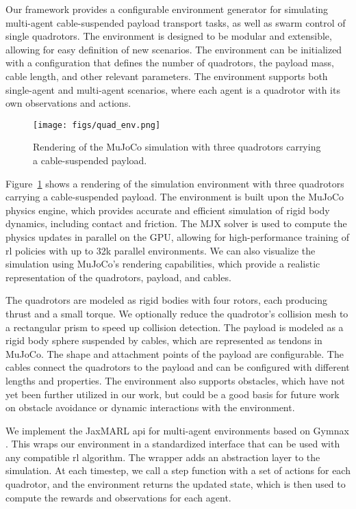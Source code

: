 Our framework provides a configurable environment generator for simulating multi-agent cable-suspended payload transport tasks, as well as swarm control of single quadrotors. The environment is designed to be modular and extensible, allowing for easy definition of new scenarios. The environment can be initialized with a configuration that defines the number of quadrotors, the payload mass, cable length, and other relevant parameters. The environment supports both single-agent and multi-agent scenarios, where each agent is a quadrotor with its own observations and actions.
\begin{figure}
\centering
\texttt{[image: figs/quad\_env.png]}
\caption[Simulation Environment]{Rendering of the MuJoCo simulation with three quadrotors carrying a cable-suspended payload.}
\label{fig:crazyflie_env}
\end{figure}

Figure~\ref{fig:crazyflie_env} shows a rendering of the simulation environment with three quadrotors carrying a cable-suspended payload. The environment is built upon the MuJoCo physics engine, which provides accurate and efficient simulation of rigid body dynamics, including contact and friction. The MJX solver is used to compute the physics updates in parallel on the GPU, allowing for high-performance training of \gls{rl} policies with up to 32k parallel environments. We can also visualize the simulation using MuJoCo's rendering capabilities, which provide a realistic representation of the quadrotors, payload, and cables.

The quadrotors are modeled as rigid bodies with four rotors, each producing thrust and a small torque. We optionally reduce the quadrotor's collision mesh to a rectangular prism to speed up collision detection. The payload is modeled as a rigid body sphere suspended by cables, which are represented as tendons in MuJoCo. The shape and attachment points of the payload are configurable. The cables connect the quadrotors to the payload and can be configured with different lengths and properties. The environment also supports obstacles, which have not yet been further utilized in our work, but could be a good basis for future work on obstacle avoidance or dynamic interactions with the environment.

We implement the JaxMARL \gls{api} for multi-agent environments based on Gymnax \autocite{gymnax2022github}. This wraps our environment in a standardized interface that can be used with any compatible \gls{rl} algorithm. The wrapper adds an abstraction layer to the simulation. At each timestep, we call a step function with a set of actions for each quadrotor, and the environment returns the updated state, which is then used to compute the rewards and observations for each agent.

